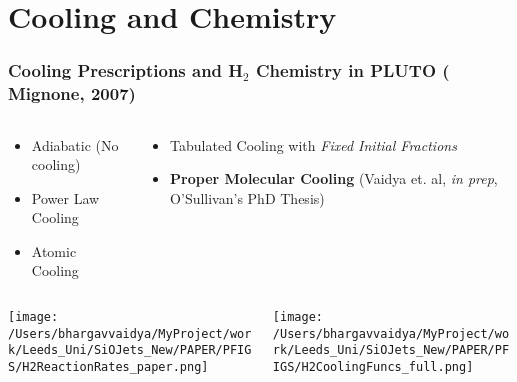 \documentclass[8pt,xcolor=dvipsnames]{beamer}
\begin{document}
\section{Cooling and Chemistry}
\begin{frame}
\frametitle{Cooling Prescriptions and H$_{2}$ Chemistry in PLUTO
 ( \alert{Mignone, 2007})}
\begin{columns}[C]
    \begin{column}{.5\textwidth}
     \begin{itemize}
     \item Adiabatic (No cooling)
     \item Power Law Cooling
     \item Atomic Cooling 
  \end{itemize}
    \end{column}
    \begin{column}{.5\textwidth} 
     \begin{itemize}
     \item Tabulated Cooling with {\em Fixed Initial Fractions}
     \item \textbf{Proper Molecular Cooling} (\alert{Vaidya et. al,
         \textit{in prep}, O'Sullivan's PhD Thesis})
     \end{itemize}

    \end{column}
  \end{columns}

\vskip10pt
\begin{columns}[C]
    \begin{column}{.5\textwidth}
      \texttt{[image: /Users/bhargavvaidya/MyProject/work/Leeds\_Uni/SiOJets\_New/PAPER/PFIGS/H2ReactionRates\_paper.png]}
    \end{column}
    \begin{column}{.5\textwidth}  
      \texttt{[image: /Users/bhargavvaidya/MyProject/work/Leeds\_Uni/SiOJets\_New/PAPER/PFIGS/H2CoolingFuncs\_full.png]}
    \end{column}
  \end{columns}
\end{frame}
\end{document}
